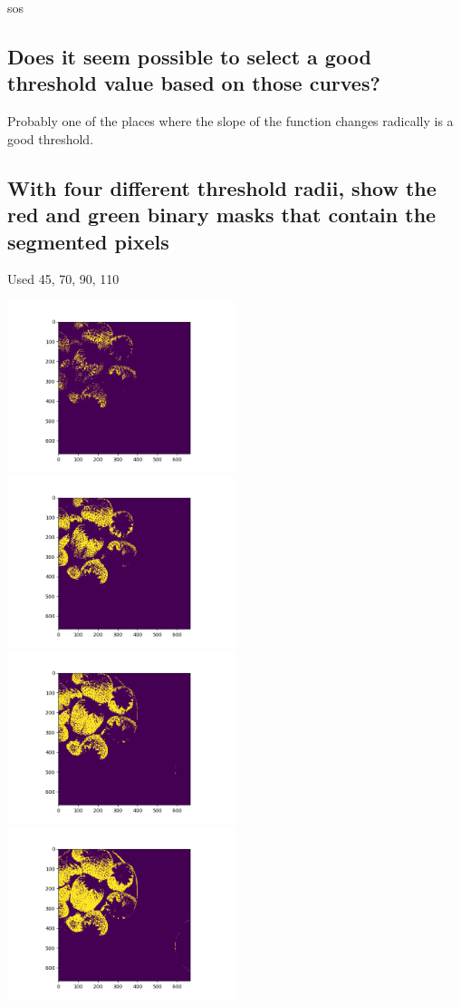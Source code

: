 \documentclass{article}
\begin{document}
    sos
    \subsection{Does it seem possible to select a good threshold value based on those curves?}
    Probably one of the places where the slope of the function changes radically is a good threshold.

    \subsection{With four different threshold radii, show the red and green binary masks that contain the segmented pixels}
        Used 45, 70, 90, 110

        \includegraphics[height=50mm]{red_mask_45}
        \includegraphics[height=50mm]{red_mask_70}
        \includegraphics[height=50mm]{red_mask_90}
        \includegraphics[height=50mm]{red_mask_110}
\end{document}
